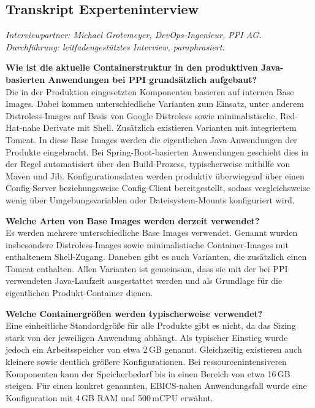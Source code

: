 
\subsection{Transkript Experteninterview}
\label{sec:interview-transkript}

\textit{Interviewpartner: Michael Grotemeyer, DevOps-Ingenieur, PPI AG.}\\
\textit{Durchführung: leitfadengestütztes Interview, paraphrasiert.}

\medskip
\resetlinenumber
\begin{linenumbers}

	\textbf{Wie ist die aktuelle Containerstruktur in den produktiven Java-basierten Anwendungen bei PPI grundsätzlich aufgebaut?}\\
	Die in der Produktion eingesetzten Komponenten basieren auf internen Base Images. Dabei kommen unterschiedliche Varianten zum Einsatz, unter anderem Distroless-Images auf Basis von Google Distroless sowie minimalistische, Red-Hat-nahe Derivate mit Shell. Zusätzlich existieren Varianten mit integriertem Tomcat. In diese Base Images werden die eigentlichen Java-Anwendungen der Produkte eingebracht. Bei Spring-Boot-basierten Anwendungen geschieht dies in der Regel automatisiert über den Build-Prozess, typischerweise mithilfe von Maven und Jib. Konfigurationsdaten werden produktiv überwiegend über einen Config-Server beziehungsweise Config-Client bereitgestellt, sodass vergleichsweise wenig über Umgebungsvariablen oder Dateisystem-Mounts konfiguriert wird.

	\textbf{Welche Arten von Base Images werden derzeit verwendet?}\\
	Es werden mehrere unterschiedliche Base Images verwendet. Genannt wurden insbesondere Distroless-Images sowie minimalistische Container-Images mit enthaltenem Shell-Zugang. Daneben gibt es auch Varianten, die zusätzlich einen Tomcat enthalten. Allen Varianten ist gemeinsam, dass sie mit der bei PPI verwendeten Java-Laufzeit ausgestattet werden und als Grundlage für die eigentlichen Produkt-Container dienen.

	\textbf{Welche Containergrößen werden typischerweise verwendet?}\\
	Eine einheitliche Standardgröße für alle Produkte gibt es nicht, da das Sizing stark von der jeweiligen Anwendung abhängt. Als typischer Einstieg wurde jedoch ein Arbeitsspeicher von etwa 2\,GB genannt. Gleichzeitig existieren auch kleinere sowie deutlich größere Konfigurationen. Bei ressourcenintensiveren Komponenten kann der Speicherbedarf bis in einen Bereich von etwa 16\,GB steigen. Für einen konkret genannten, EBICS-nahen Anwendungsfall wurde eine Konfiguration mit 4\,GB RAM und 500\,mCPU erwähnt.


\end{linenumbers}
